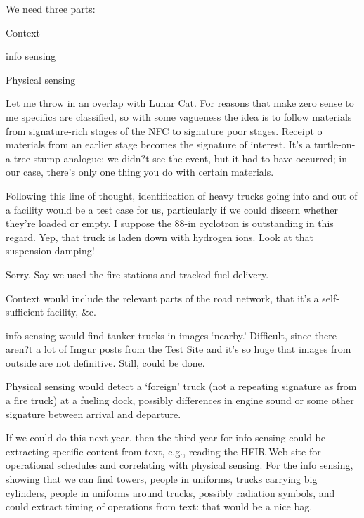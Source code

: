 \documentclass{article} %
\begin{document}
We need three parts:
\begin{enumerate*}
\item Context 
\item info sensing
\item Physical sensing
\end{enumerate*}

Let me throw in an overlap with Lunar Cat. For reasons that make zero sense to me specifics are classified, so with some vagueness the idea is to follow materials from signature-rich stages of the NFC to signature poor stages. Receipt o materials from an earlier stage becomes the signature of interest. It's a turtle-on-a-tree-stump analogue: we didn?t see the event, but it had to have occurred; in our case, there's only one thing you do with certain materials. 

Following this line of thought, identification of heavy trucks going into and out of a facility would be a test case for us, particularly if we could discern whether they're loaded or empty. I suppose the 88-in cyclotron is outstanding in this regard. Yep, that truck is laden down with hydrogen ions. Look at that suspension damping!

Sorry. Say we used the fire stations and tracked fuel delivery.
\begin{enumerate*}
\item Context would include the relevant parts of the road network, that it's a self-sufficient facility, \&c.
\item info sensing would find tanker trucks in images `nearby.' Difficult, since there aren?t a lot of Imgur posts from the Test Site and it's so huge that images from outside are not definitive. Still, could be done.
\item Physical sensing would detect a `foreign' truck (not a repeating signature as from a fire truck) at a fueling dock, possibly differences in engine sound or some other signature between arrival and departure.
\end{enumerate*}

If we could do this next year, then the third year for info sensing could be extracting specific content from text, e.g., reading the HFIR Web site for operational schedules and correlating with physical sensing. For the info sensing, showing that we can find towers, people in uniforms, trucks carrying big cylinders, people in uniforms around trucks, possibly radiation symbols, and could extract timing of operations from text: that would be a nice bag. 
\end{document}
